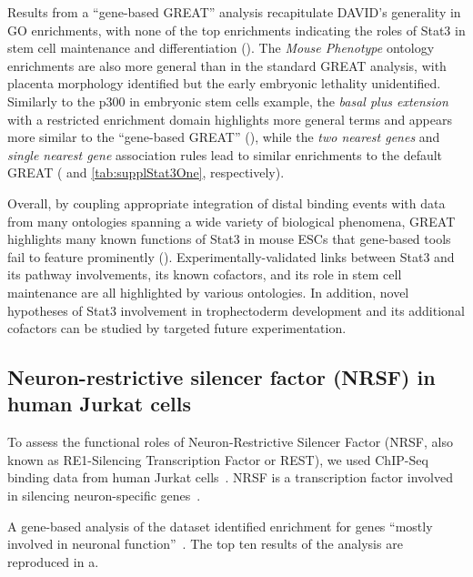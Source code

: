 Results from a ``gene-based GREAT'' analysis recapitulate DAVID's generality in GO enrichments,
with none of the top enrichments indicating the roles of Stat3 in stem cell maintenance and differentiation
().  The \emph{Mouse Phenotype} ontology enrichments are also more
general than in the standard GREAT analysis, with placenta morphology identified but the 
early embryonic lethality unidentified.
%
Similarly to the p300 in embryonic stem cells example, the \emph{basal plus extension} with a
restricted enrichment domain highlights more general terms and appears more similar to the
``gene-based GREAT'' (), while the \emph{two nearest genes} and
\emph{single nearest gene} association rules lead to similar enrichments to the default
GREAT ( and \ref{tab:supplStat3One}, respectively).

Overall, by coupling appropriate integration of distal binding events with data from
many ontologies spanning a wide variety of biological phenomena, GREAT highlights
many known functions of Stat3 in mouse ESCs that gene-based
tools fail to feature prominently ().  Experimentally-validated
links between Stat3 and its pathway involvements, its known
cofactors, and its role in stem cell maintenance are all highlighted by
various ontologies.  In addition, novel hypotheses of Stat3 involvement in
trophectoderm development and its additional cofactors can be studied by
targeted future experimentation.
%

\subsection{Neuron-restrictive silencer factor (NRSF) in human Jurkat cells}
To assess the functional roles of Neuron-Restrictive Silencer Factor (NRSF, also known as
RE1-Silencing Transcription Factor or REST), we used ChIP-Seq binding data from human
Jurkat cells~\citep{Valouev2008}.  NRSF is a transcription factor involved in
silencing neuron-specific genes~\citep{Chong1995, Schoenherr1995, Chen1998}.

A gene-based analysis of the dataset identified enrichment for
genes ``mostly involved in neuronal function''~\citep{Valouev2008}.  The top ten results
of the analysis are reproduced in a.

